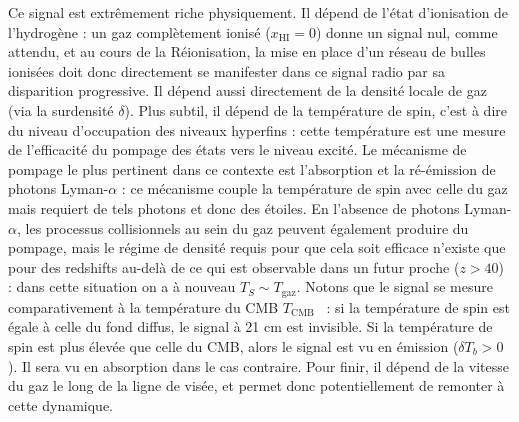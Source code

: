  Ce signal est extrêmement riche physiquement. Il dépend de l'état d'ionisation de l'hydrogène : un gaz complètement ionisé ($x_\mathrm{HI}=0$) donne un signal nul, comme attendu, et au cours de la Réionisation, la mise en place d'un réseau de bulles ionisées doit donc directement se manifester dans ce signal radio par sa disparition progressive. Il dépend aussi directement de la densité locale de gaz (via la surdensité $\delta$). Plus subtil, il dépend de la température de spin, c'est à dire du niveau d'occupation des niveaux hyperfins : cette température est une mesure de l'efficacité du pompage des états vers le niveau excité. Le mécanisme de pompage le plus pertinent dans ce contexte est l'absorption et la ré-émission de photons Lyman-$\alpha$ : ce mécanisme couple la température de spin avec celle du gaz mais requiert de tels photons et donc des étoiles.  En l'absence de photons Lyman-$\alpha$, les processus collisionnels au sein du gaz peuvent également produire du pompage, mais le régime de densité requis pour que cela soit efficace n'existe que pour des redshifts au-delà de ce qui est observable dans un futur proche ($z>40$) : dans cette situation on a à nouveau $T_S\sim T_\mathrm{gaz}$. Notons que le signal se mesure comparativement à la température du CMB $T_\mathrm{CMB}$ ~: si la température de spin est égale à celle du fond diffus, le signal à 21 cm est invisible. Si la température de spin est plus élevée que celle du CMB, alors le signal est vu en émission ($\delta T_b >0$). Il sera vu en absorption dans le cas contraire. Pour finir, il dépend de la vitesse du gaz le long de la ligne de visée, et permet donc potentiellement de remonter à cette dynamique.

